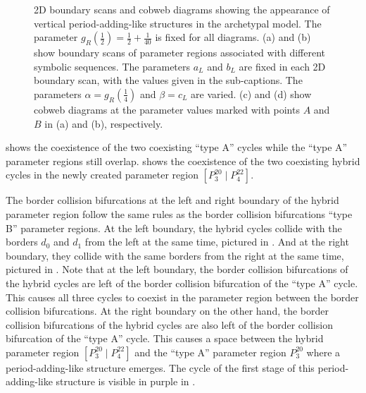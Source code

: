 \begin{figure}
{		\label{fig:add.change.appa.vert.cobweb.A}
	}
	\caption[2D boundary scans and cobweb diagrams showing the appearance of vertical period-adding-like structures in the archetypal model]{
		2D boundary scans and cobweb diagrams showing the appearance of vertical period-adding-like structures in the archetypal model.
		The parameter $g_R\left(\frac{1}{2}\right) = \frac{1}{2} + \frac{1}{40}$ is fixed for all diagrams.
		(a) and (b) show boundary scans of parameter regions associated with different symbolic sequences.
		The parameters $a_L$ and $b_L$ are fixed in each 2D boundary scan, with the values given in the sub-captions.
		The parameters $\alpha = g_R\left(\frac{1}{4}\right)$ and $\beta = c_L$ are varied.
		(c) and (d) show cobweb diagrams at the parameter values marked with points $A$ and $B$ in (a) and (b), respectively.
	}
\end{figure}

 shows the coexistence of the two coexisting ``type A'' cycles while the ``type A'' parameter regions still overlap.
 shows the coexistence of the two coexisting hybrid cycles in the newly created parameter region $\left[P^{20}_3 \mid P^{22}_4\right]$.

The border collision bifurcations at the left and right boundary of the hybrid parameter region follow the same rules as the border collision bifurcations ``type B'' parameter regions.
At the left boundary, the hybrid cycles collide with the borders $d_0$ and $d_1$ from the left at the same time, pictured in .
And at the right boundary, they collide with the same borders from the right at the same time, pictured in .
Note that at the left boundary, the border collision bifurcations of the hybrid cycles are left of the border collision bifurcation of the ``type A'' cycle.
This causes all three cycles to coexist in the parameter region between the border collision bifurcations.
At the right boundary on the other hand, the border collision bifurcations of the hybrid cycles are also left of the border collision bifurcation of the ``type A'' cycle.
This causes a space between the hybrid parameter region $\left[P^{20}_3 \mid P^{22}_4\right]$ and the ``type A'' parameter region $P^{20}_3$ where a period-adding-like structure emerges.
The cycle of the first stage of this period-adding-like structure is visible in purple in .

